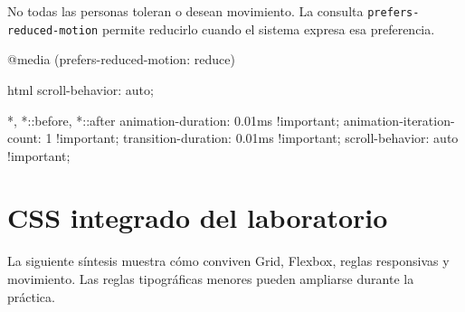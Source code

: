 \documentclass[11pt]{article}
\begin{document}
No todas las personas toleran o desean movimiento. La consulta
\texttt{prefers-reduced-motion} permite reducirlo cuando el sistema expresa esa
preferencia.

\begin{csscodedark}
@media (prefers-reduced-motion: reduce) {
    html {
        scroll-behavior: auto;
    }

    *, *::before, *::after {
        animation-duration: 0.01ms !important;
        animation-iteration-count: 1 !important;
        transition-duration: 0.01ms !important;
        scroll-behavior: auto !important;
    }
}
\end{csscodedark}


\section{CSS integrado del laboratorio}

La siguiente síntesis muestra cómo conviven Grid, Flexbox, reglas responsivas y
movimiento. Las reglas tipográficas menores pueden ampliarse durante la práctica.
\end{document}

